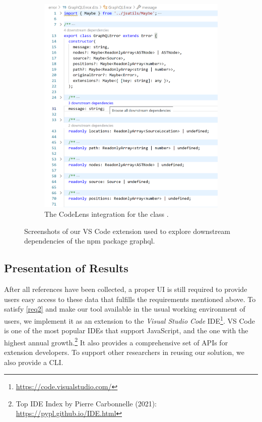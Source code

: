 \begin{figure}
\begin{subfigure}{.32\linewidth}
		\includegraphics[width=\linewidth]{sections/4_implementation/extension/codelens.png}
		\caption[LoF entry]{The CodeLens integration for the class .}
		\label{fig:implementation/presentation/screenshot/codelens}
	\end{subfigure}

	\caption{Screenshots of our VS Code extension used to explore downstream dependencies of the npm package graphql.}
	\label{fig:implementation/presentation/screenshots}
\end{figure}

\subsection{Presentation of Results}
\label{sec:implementation/presentation}

After all references have been collected, a proper UI is still required to provide users easy access to these data that fulfills the requirements mentioned above.
To satisfy \cref{req2} and make our tool available in the usual working environment of users, we implement it as an extension to the \emph{Visual Studio Code} IDE\footnote{\url{https://code.visualstudio.com/}}.
VS Code is one of the most popular IDEs that support JavaScript, and the one with the highest annual growth.\footnote{Top IDE Index by Pierre Carbonnelle (2021): \url{https://pypl.github.io/IDE.html}}
It also provides a comprehensive set of APIs for extension developers.
To support other researchers in reusing our solution, we also provide a CLI.

